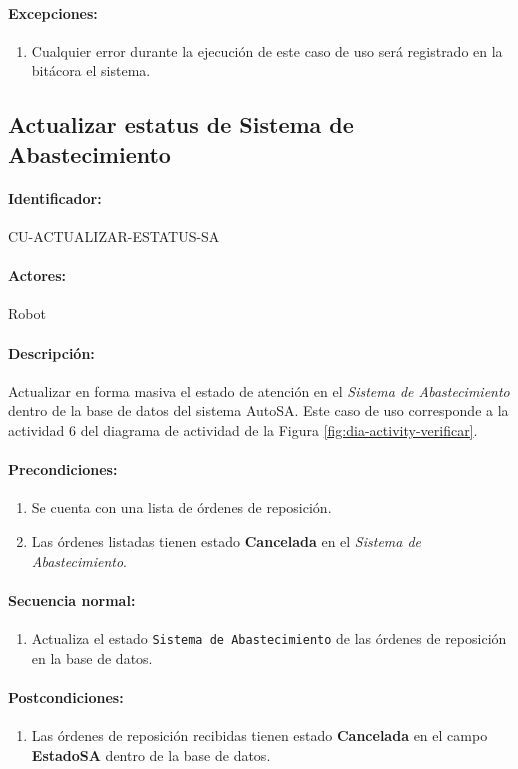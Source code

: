 \paragraph{Excepciones:}
\begin{enumerate}
  \item Cualquier error durante la ejecución de este caso de uso será registrado en la bitácora el sistema.
\end{enumerate}


\subsection{Actualizar estatus de Sistema de Abastecimiento}\label{cu-actualizar-estatus-sa}
\paragraph{Identificador:}
CU-ACTUALIZAR-ESTATUS-SA
\paragraph{Actores:}
Robot
\paragraph{Descripción:}
Actualizar en forma masiva el estado de atención en el \textit{Sistema de Abastecimiento} dentro de la base de datos del sistema AutoSA. Este caso de uso corresponde a la actividad 6 del diagrama de actividad de la Figura \ref{fig:dia-activity-verificar}.
\paragraph{Precondiciones:}
\begin{enumerate}
  \item Se cuenta con una lista de órdenes de reposición.
  \item Las órdenes listadas tienen estado \textbf{Cancelada} en el \textit{Sistema de Abastecimiento}. 
\end{enumerate}
\paragraph{Secuencia normal:}
\begin{enumerate}
  \item Actualiza el estado \texttt{Sistema de Abastecimiento} de las órdenes de reposición en la base de datos.
\end{enumerate}
\paragraph{Postcondiciones:}
\begin{enumerate}
  \item Las órdenes de reposición recibidas tienen estado \textbf{Cancelada} en el campo \textbf{EstadoSA} dentro de la base de datos.
\end{enumerate}
